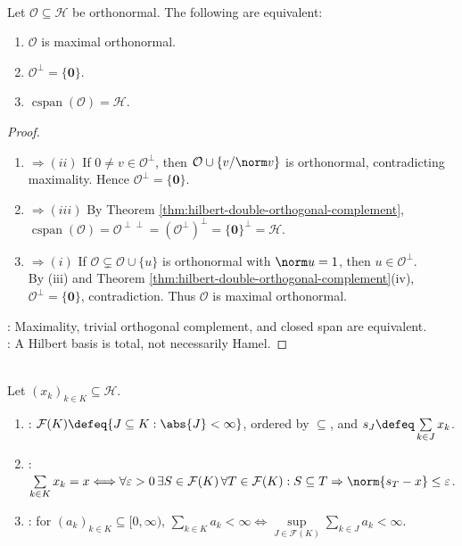 \begin{theorem} \label{thm:hilbert-basis-total-characterizations} \\
Let $\mathcal{O}\subseteq\mathcal{H}$ be orthonormal. The following are equivalent:
\begin{enumerate}[label=(\roman*)]
\setlength{\itemsep}{0pt}
\item $\mathcal{O}$ is maximal orthonormal.
\item $\mathcal{O}^{\perp}=\{\mathbf{0}\}$.
\item $\operatorname{cspan}(\mathcal{O})=\mathcal{H}$.
\end{enumerate}
\begin{proof}
\begin{enumerate}[label=(\roman*)]
\setlength{\itemsep}{0pt}
\item[$(i)$]$\Rightarrow (ii)$ If $0\ne v\in\mathcal O^\perp$, then $\mathcal O\cup\{v/\norm v\}$ is orthonormal, contradicting maximality. Hence $\mathcal O^\perp=\{\mathbf0\}$.
\item[$(ii)$]$\Rightarrow (iii)$ By Theorem \ref{thm:hilbert-double-orthogonal-complement}, $\operatorname{cspan}(\mathcal O)=\mathcal O^{\perp\perp}=(\mathcal O^\perp)^\perp=\{\mathbf0\}^\perp=\mathcal H$.
\item[$(iii)$]$\Rightarrow (i)$ If $\mathcal O\subsetneq\mathcal O\cup\{u\}$ is orthonormal with $\norm u=1$, then $u\in\mathcal O^\perp$.\\
By (iii) and Theorem \ref{thm:hilbert-double-orthogonal-complement}(iv), $\mathcal O^\perp=\{\mathbf0\}$, contradiction. Thus $\mathcal O$ is maximal orthonormal.
\end{enumerate}
: Maximality, trivial orthogonal complement, and closed span are equivalent.\\
: A Hilbert basis is total, not necessarily Hamel.
\end{proof}
\end{theorem}

\begin{definition} \label{def:arbitrary-hilbert-sum-net} \\
Let $(x_k)_{k\in K}\subseteq\mathcal{H}$.
\begin{enumerate}[label=(\roman*)]
\setlength{\itemsep}{0pt}
\item {}: $\mathcal{F}(K)\defeq\{J\subseteq K:\abs{J}<\infty\}$, ordered by $\subseteq$, and $s_J\defeq\sum\limits_{k\in J}x_k$.
\item {}: $\sum\limits_{k\in K}x_k=x\Longleftrightarrow\forall\varepsilon>0\,\exists S\in\mathcal{F}(K)\,\forall T\in\mathcal{F}(K):S\subseteq T\Rightarrow\norm{s_T-x}\leq\varepsilon$.
\item {}: for $(a_k)_{k\in K}\subseteq[0,\infty)$, $\sum\limits_{k\in K}a_k<\infty\Longleftrightarrow\sup\limits_{J\in\mathcal{F}(K)}\sum\limits_{k\in J}a_k<\infty$.
\end{enumerate}
\end{definition}

